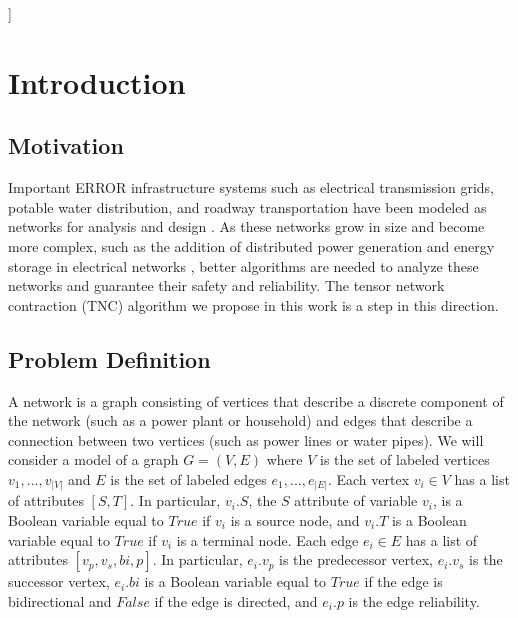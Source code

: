 \documentclass[12pt,twocolumn]{article}
\newcommand{\seven}{\fontsize{7pt}{\baselineskip}\selectfont}    %
\begin{document}
\vspace*{20pt}
]



\BeforeBeginEnvironment{tabularx}{\begin{center}\seven}

\addtolength{\textfloatsep}{-0.2in}
\hypertarget{introduction}{%
\section{Introduction}\label{introduction}}

\hypertarget{motivation}{%
\subsection{Motivation}\label{motivation}}

Important ERROR infrastructure systems such as electrical transmission grids, potable water distribution, and roadway transportation have been modeled as networks for analysis and design \cite{levy1967monte} \cite{cotilla2012comparing}. As these networks grow in size and become more complex, such as the addition of distributed power generation and energy storage in electrical networks \cite{escalera2018survey}, better algorithms are needed to analyze these networks and guarantee their safety and reliability. The tensor network contraction (TNC) algorithm we propose in this work is a step in this direction.

\hypertarget{problem-definition}{%
\subsection{Problem Definition}\label{problem-definition}}

A network is a graph consisting of vertices that describe a discrete component of the network (such as a power plant or household) and edges that describe a connection between two vertices (such as power lines or water pipes). We will consider a model of a graph \(G = (V,E)\) where \(V\) is the set of labeled vertices \(v_1,...,v_{|V|}\) and \(E\) is the set of labeled edges \(e_1,...,e_{|E|}\). Each vertex \(v_i \in V\) has a list of attributes \([S,T]\). In particular, \(v_i.S\), the \(S\) attribute of variable \(v_i\), is a Boolean variable equal to \(True\) if \(v_i\) is a source node, and \(v_i.T\) is a Boolean variable equal to \(True\) if \(v_i\) is a terminal node. Each edge \(e_i \in E\) has a list of attributes \([v_p,v_s,bi,p]\). In particular, \(e_i.v_p\) is the predecessor vertex, \(e_i.v_s\) is the successor vertex, \(e_i.bi\) is a Boolean variable equal to \(True\) if the edge is bidirectional and \(False\) if the edge is directed, and \(e_i.p\) is the edge reliability.
\end{document}

